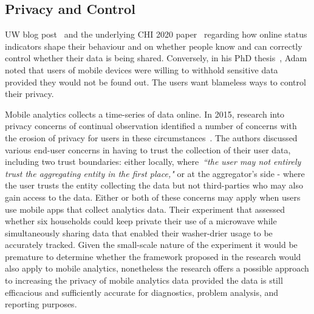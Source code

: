 \subsection{Privacy and Control}

UW blog post~\cite{mcquate_I_saw_you_were_online} and the underlying CHI 2020 paper~\cite{cobb2020_ux_s_with_online_status_indicators} regarding how online status indicators shape their behaviour and on whether people know and can correctly control whether their data is being shared. Conversely, in his PhD thesis~\citep{adam2009balancing}, Adam noted that users of mobile devices were willing to withhold sensitive data provided they would not be found out. The users want blameless ways to control their privacy.

Mobile analytics collects a time-series of data online. In 2015, research into privacy concerns of continual observation identified a number of concerns with the erosion of privacy for users in these circumstances~\citep{erdogdu2015_privacy_utility_tradeoff_under_continual_observation}. The authors discussed various end-user concerns in having to trust the collection of their user data, including two trust boundaries: either locally, where~\emph{``the user may not entirely trust the aggregating entity in the first place,"} or at the aggregator's side - where the user trusts the entity collecting the data but not third-parties who may also gain access to the data. Either or both of these concerns may apply when users use mobile apps that collect analytics data. Their experiment that assessed whether six households could keep private their use of a microwave while simultaneously sharing data that enabled their washer-drier usage to be accurately tracked. Given the small-scale nature of the experiment it would be premature to determine whether the framework proposed in the research would also apply to mobile analytics, nonetheless the research offers a possible approach to increasing the privacy of mobile analytics data provided the data is still efficacious and sufficiently accurate for diagnostics, problem analysis, and reporting purposes.  


